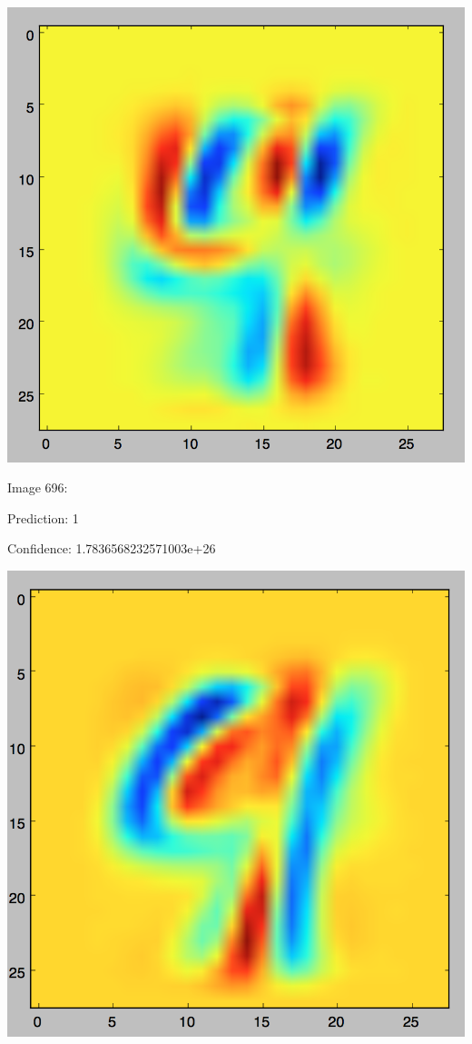 \documentclass[twoside,11pt]{homework}
\begin{document}
\includegraphics[scale=.5]{images/1647.png}

Image 696:

Prediction: 1

Confidence: 1.7836568232571003e+26

\includegraphics[scale=.5]{images/696.png}
\end{document}
